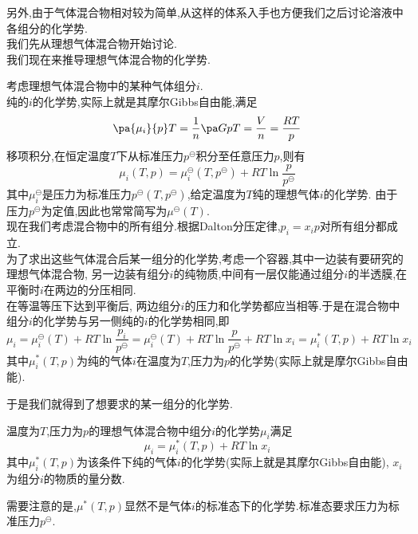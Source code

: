 \documentclass{ctexart}
\begin{document}
另外,由于气体混合物相对较为简单,从这样的体系入手也方便我们之后讨论溶液中各组分的化学势.\\
\indent 我们先从理想气体混合物开始讨论.\vspace{4pt}\\
\indent 我们现在来推导理想气体混合物的化学势.
\begin{derivation}
    考虑理想气体混合物中的某种气体组分$i$.\\
    纯的$i$的化学势,实际上就是其摩尔Gibbs自由能,满足
    \begin{equation}
        \pa{\mu_i}{p}T=\dfrac{1}{n}\pa GpT=\dfrac{V}{n}=\dfrac{RT}{p}
    \end{equation}
    移项积分,在恒定温度$T$下从标准压力$p^\ominus$积分至任意压力$p$,则有
    \[\mu_i(T,p)=\mu_i^\ominus\left(T,p^\ominus\right)+RT\ln\dfrac{p}{p^\ominus}\]
    其中$\mu_i^\ominus$是压力为标准压力$p^\ominus\left(T,p^\ominus\right)$,给定温度为$T$纯的理想气体$i$的化学势.%
    由于压力$p^\ominus$为定值,因此也常常简写为$\mu^\ominus(T)$.\\
    现在我们考虑混合物中的所有组分.根据Dalton分压定律,$p_i=x_ip$对所有组分都成立.\\
    为了求出这些气体混合后某一组分的化学势,考虑一个容器,其中一边装有要研究的理想气体混合物,%
    另一边装有组分$i$的纯物质,中间有一层仅能通过组分$i$的半透膜,在平衡时$i$在两边的分压相同\footnotemark.\\
    在等温等压下达到平衡后,%
    两边组分$i$的压力和化学势都应当相等.于是在混合物中组分$i$的化学势与另一侧纯的$i$的化学势相同,即
    \begin{equation}
        \mu_i=\mu_i^\ominus(T)+RT\ln\dfrac{p_i}{p^\ominus}
        =\mu_i^\ominus(T)+RT\ln\dfrac{p}{p^\ominus}+RT\ln x_i
        =\mu_i^\ast(T,p)+RT\ln x_i
    \end{equation}
    其中$\mu_i^\ast(T,p)$为纯的气体$i$在温度为$T$,压力为$p$的化学势(实际上就是摩尔Gibbs自由能).
\end{derivation}
于是我们就得到了想要求的某一组分的化学势.
\begin{theorem}[4B.4.1 理想气体混合物中各组分的化学势]
    温度为$T$,压力为$p$的理想气体混合物中组分$i$的化学势$\mu_i$满足
    \[\mu_i=\mu_i^{\ast}(T,p)+RT\ln x_i\]
    其中$\mu_i^{\ast}(T,p)$为该条件下纯的气体$i$的化学势(实际上就是其摩尔Gibbs自由能),%
    $x_i$为组分$i$的物质的量分数.
\end{theorem}
需要注意的是,$\mu^{\ast}(T,p)$显然不是气体$i$的标准态下的化学势.标准态要求压力为标准压力$p^\ominus$.\vspace{4pt}\\
\end{document}
